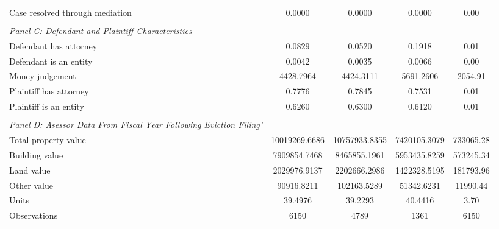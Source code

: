 {\begin{tabular}{l*{4}{c}}
\hspace{0.25cm}Case resolved through mediation&     0.0000 &     0.0000 &     0.0000 &        0.00\\
\vspace{0.1em} \\ \emph{Panel C: Defendant and Plaintiff Characteristics}&            &            &            &            \\
\hspace{0.25cm}Defendant has attorney&     0.0829 &     0.0520 &     0.1918 &        0.01\\
\hspace{0.25cm}Defendant is an entity&     0.0042 &     0.0035 &     0.0066 &        0.00\\
\hspace{0.25cm}Money judgement&  4428.7964 &  4424.3111 &  5691.2606 &     2054.91\\
\hspace{0.25cm}Plaintiff has attorney&     0.7776 &     0.7845 &     0.7531 &        0.01\\
\hspace{0.25cm}Plaintiff is an entity&     0.6260 &     0.6300 &     0.6120 &        0.01\\
\vspace{0.1em} \\ \emph{Panel D: Asessor Data From Fiscal Year Following Eviction Filing'}&            &            &            &            \\
\hspace{0.25cm}Total property value&10019269.6686 &10757933.8355 &7420105.3079 &   733065.28\\
\hspace{0.25cm}Building value&7909854.7468 &8465855.1961 &5953435.8259 &   573245.34\\
\hspace{0.25cm}Land value&2029976.9137 &2202666.2986 &1422328.5195 &   181793.96\\
\hspace{0.25cm}Other value& 90916.8211 &102163.5289 & 51342.6231 &    11990.44\\
\hspace{0.25cm}Units&    39.4976 &    39.2293 &    40.4416 &        3.70\\
\midrule
Observations        &        6150&        4789&        1361&        6150\\
\bottomrule
\end{tabular}
}
